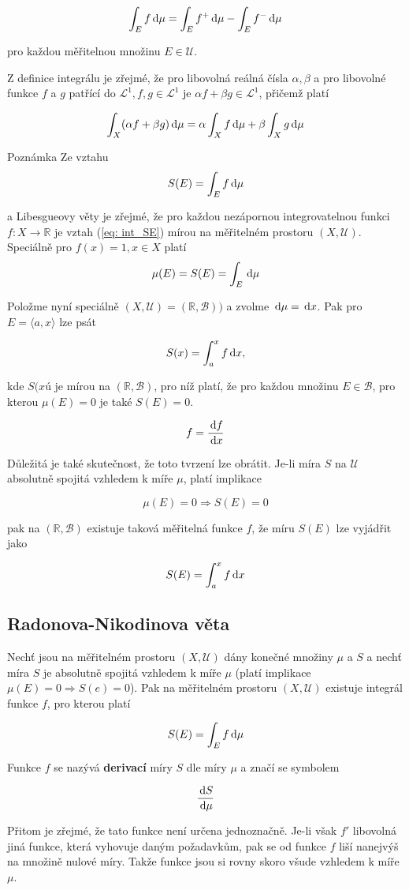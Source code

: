 \[ \int_E f\,\mathrm{d} \mu = \int_E f^+\,\mathrm{d} \mu - \int_E f^-\,\mathrm{d} \mu \]

pro každou měřitelnou množinu $E\in\mathscr{U}$.\br

Z definice integrálu je zřejmé, že pro libovolná reálná čísla $\alpha,\beta$ a pro libovolné funkce $f$ a $g$ patřící do $\mathscr{L}^1, f,g\in\mathscr{L}^1$ je $\alpha f + \beta g\in\mathscr{L}^1$, přičemž platí

\[ \int_X(\alpha f + \beta g)\,\mathrm{d} \mu = \alpha\int_X f\,\mathrm{d} \mu + \beta\int_X g\,\mathrm{d} \mu \]

\begin{note}{Poznámka}
Ze vztahu
\begin{equation}
S(E) = \int_E f\,\mathrm{d} \mu
\label{eq: int_SE}
\end{equation}

a Libesgueovy věty je zřejmé, že pro každou nezápornou integrovatelnou funkci $f: X\to\mathbb{R}$ je vztah (\ref{eq: int_SE}) mírou na měřitelném prostoru $(X,\mathscr{U})$. Speciálně pro $f(x)=1, x\in X$ platí
\[ \mu(E)=S(E)=\int_E\,\mathrm{d} \mu \]
\end{note}

Položme nyní speciálně $(X, \mathscr{U})=(\mathbb{R},\mathscr{B}))$ a zvolme $\,\mathrm{d} \mu=\,\mathrm{d} x$. Pak pro $E=\langle a, x\rangle$ lze psát

\[ S(x) = \int_a^x f\,\mathrm{d} x, \]

kde $S(xú$ je mírou na $(\mathbb{R},\mathscr{B})$, pro níž platí, že pro každou množinu $E\in\mathscr{B}$, pro kterou $\mu(E)=0$ je také $S(E)=0$.

\[ f=\frac{\,\mathrm{d}  f}{\,\mathrm{d}  x} \]

Důležitá je také skutečnost, že toto tvrzení lze obrátit. Je-li míra $S$ na $\mathscr{U}$ absolutně spojitá vzhledem k míře $\mu$, platí implikace

\[ \mu(E) = 0 \Rightarrow S(E) = 0 \]

pak na $(\mathbb{R},\mathscr{B})$ existuje taková měřitelná funkce $f$, že míru $S(E)$ lze vyjádřit jako

\[ S(E) = \int_a^x f\,\mathrm{d} x \]

\subsection{Radonova-Nikodinova věta}
Nechť jsou na měřitelném prostoru $(X,\mathscr{U})$ dány konečné množiny $\mu$ a $S$ a nechť míra $S$ je absolutně spojitá vzhledem k míře $\mu$ (platí implikace $\mu(E) = 0 \Rightarrow S(e) = 0$). Pak na měřitelném prostoru $(X,\mathscr{U})$ existuje integrál funkce $f$, pro kterou platí

\[ S(E) = \int_E f\,\mathrm{d} \mu \]

Funkce $f$ se nazývá \textbf{derivací} míry $S$ dle míry $\mu$ a značí se symbolem

\[ \frac{\,\mathrm{d}  S}{\,\mathrm{d} \mu} \]

Přitom je zřejmé, že tato funkce není určena jednoznačně. Je-li však $f'$ libovolná jiná funkce, která vyhovuje daným požadavkům, pak se od funkce $f$ liší nanejvýš na množině nulové míry. Takže funkce jsou si rovny skoro všude vzhledem k míře $\mu$.
